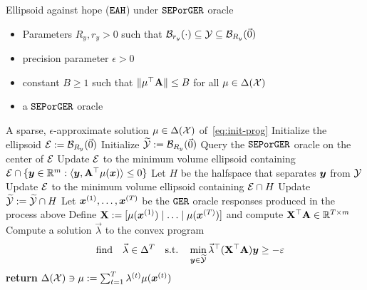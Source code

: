 \begin{algorithm}[!ht]
\caption{Ellipsoid against hope ($\mathtt{EAH}$) under $\mathtt{SEPorGER}$ oracle~\citep{Daskalakis24:Efficient}}
\label{alg:eah}
\begin{algorithmic}[1]
\INPUT 
\begin{minipage}[t]{\linewidth} %
\begin{itemize}[noitemsep,topsep=0pt,leftmargin=*]
    \item Parameters $R_y, r_y > 0$ such that ${\mathcal{B}}_{r_y}(\cdot) \subseteq {\mathcal{Y}} \subseteq {\mathcal{B}}_{R_y}(\vec{0})$
    \item precision parameter $\epsilon > 0$
    \item constant $B \geq 1$ such that $\| \mu^\top \mathbf{A} \| \leq B$ for all $\mu \in \Delta({\mathcal{X}})$
    \item a $\mathtt{SEPorGER}$ oracle
\end{itemize}
\end{minipage}
\OUTPUT A sparse, $\epsilon$-approximate solution $\mu \in \Delta({\mathcal{X}})$ of~\eqref{eq:init-prog}
\STATE Initialize the ellipsoid ${\mathcal{E}} := {\mathcal{B}}_{R_y}(\vec{0})$
\STATE Initialize $\widetilde{{\mathcal{Y}}} := {\mathcal{B}}_{R_y}(\vec{0})$
    \STATE Query the $\mathtt{SEPorGER}$ oracle on the center of ${\mathcal{E}}$
        \STATE Update ${\mathcal{E}}$ to the minimum volume ellipsoid containing ${\mathcal{E}} \cap \{ {\bm{y}} \in \mathbb R^m : \langle {\bm{y}}, \mathbf{A}^\top \mu({\bm{x}}) \rangle \leq 0 \} $
    \ELSE
        \STATE Let $H$ be the halfspace that separates ${\bm{y}}$ from ${\mathcal{Y}}$
        \STATE Update ${\mathcal{E}}$ to the minimum volume ellipsoid containing ${\mathcal{E}} \cap H$
        \STATE Update $\widetilde{{\mathcal{Y}}} := \widetilde{{\mathcal{Y}}} \cap H$
    \ENDIF
\ENDWHILE
\STATE Let ${\bm{x}}^{(1)}, \dots, {\bm{x}}^{(T)}$ be the $\mathtt{GER}$ oracle responses produced in the process above
\STATE Define $\mathbf{X} := [\mu({\bm{x}}^{(1)}) \mid \hdots \mid \mu({\bm{x}}^{(T)})]$ and compute $\mathbf{X}^\top \mathbf{A} \in \mathbb R^{T \times m} $
\STATE Compute a solution $\vec{\lambda}$ to the convex program
\begin{equation*}
    \qq{find} \vec{\lambda} \in \Delta^T \qq{s.t.} \min_{\vy \in \widetilde{\cY}} \vec{\lambda}^\top ( \mat{X}^\top \mat{A}) \vy \geq - \epsilon
\end{equation*}
\STATE \textbf{return} $\Delta({\mathcal{X}}) \ni \mu := \sum_{t=1}^T \lambda^{(t)} \mu({\bm{x}}^{(t)})$
\end{algorithmic}
\end{algorithm}

